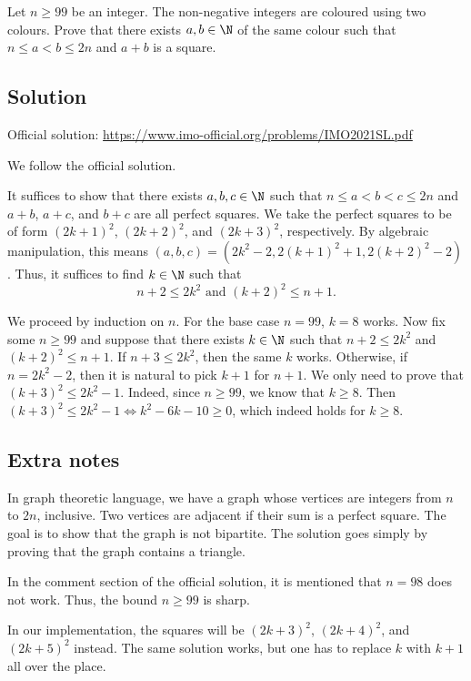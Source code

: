 Let $n \geq 99$ be an integer.
The non-negative integers are coloured using two colours.
Prove that there exists $a, b \in \N$ of the same colour such that $n \leq a < b \leq 2n$ and $a + b$ is a square.



\subsection*{Solution}

Official solution: \url{https://www.imo-official.org/problems/IMO2021SL.pdf}

We follow the official solution.

It suffices to show that there exists $a, b, c \in \N$ such that $n \leq a < b < c \leq 2n$ and $a + b$, $a + c$, and $b + c$ are all perfect squares.
We take the perfect squares to be of form $(2k + 1)^2$, $(2k + 2)^2$, and $(2k + 3)^2$, respectively.
By algebraic manipulation, this means $(a, b, c) = (2k^2 - 2, 2(k + 1)^2 + 1, 2(k + 2)^2 - 2)$.
Thus, it suffices to find $k \in \N$ such that
\[ n + 2 \leq 2k^2 \text{ and } (k + 2)^2 \leq n + 1. \]

We proceed by induction on $n$.
For the base case $n = 99$, $k = 8$ works.
Now fix some $n \geq 99$ and suppose that there exists $k \in \N$ such that $n + 2 \leq 2k^2$ and $(k + 2)^2 \leq n + 1$.
If $n + 3 \leq 2k^2$, then the same $k$ works.
Otherwise, if $n = 2k^2 - 2$, then it is natural to pick $k + 1$ for $n + 1$.
We only need to prove that $(k + 3)^2 \leq 2k^2 - 1$.
Indeed, since $n \geq 99$, we know that $k \geq 8$.
Then $(k + 3)^2 \leq 2k^2 - 1 \iff k^2 - 6k - 10 \geq 0$, which indeed holds for $k \geq 8$.



\subsection*{Extra notes}

In graph theoretic language, we have a graph whose vertices are integers from $n$ to $2n$, inclusive.
Two vertices are adjacent if their sum is a perfect square.
The goal is to show that the graph is not bipartite.
The solution goes simply by proving that the graph contains a triangle.

In the comment section of the official solution, it is mentioned that $n = 98$ does not work.
Thus, the bound $n \geq 99$ is sharp.

In our implementation, the squares will be $(2k + 3)^2$, $(2k + 4)^2$, and $(2k + 5)^2$ instead.
The same solution works, but one has to replace $k$ with $k + 1$ all over the place.
